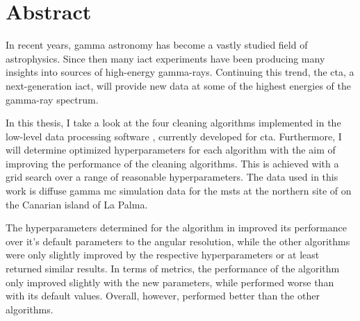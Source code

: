 \thispagestyle{plain}

\section*{Abstract}
In recent years, gamma astronomy has become a vastly studied field of astrophysics.
Since then many \gls{iact} experiments have been producing many insights into sources of
high-energy gamma-rays. Continuing this trend, the \gls{cta}, a next-generation \gls{iact},
will provide new data at some of the highest energies of the gamma-ray spectrum.

In this thesis, I take a look at the four cleaning algorithms implemented in the low-level data processing software \ctapipe{},
currently developed for \gls{cta}. Furthermore, I will determine optimized hyperparameters for each algorithm
with the aim of improving the performance of the cleaning algorithms. This is achieved with a grid search
over a range of reasonable hyperparameters. The data used in this work is diffuse gamma \gls{mc} simulation data for
the \glspl{mst} at the northern site of \cta{} on the Canarian island of La Palma.

The hyperparameters determined for the \tcc{} algorithm in \ctapipe{} improved its performance over
it's default parameters \wrt to the angular resolution, while the other algorithms were only
slightly improved by the respective hyperparameters or at least returned similar results.
In terms of metrics, the performance of the \tcc{} algorithm only improved slightly with the new parameters, while \fact{}
performed worse than with its default values. Overall, however, \fact{} performed better than the other
algorithms.


